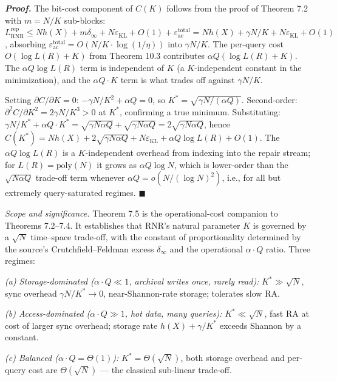 \documentclass[
]{article}
\begin{document}
\emph{\textbf{Proof.}} The bit-cost component of $C(K)$ follows from
the proof of Theorem 7.2 with $m = N/K$ sub-blocks: $L^{\mathrm{rep}}_{\mathrm{RNR}}
\leq N h(X) + m \delta_\infty + N \varepsilon_{\mathrm{KL}} + O(1) +
\varepsilon_{\mathrm{ac}}^{\mathrm{total}} = N h(X) + \gamma N/K +
N \varepsilon_{\mathrm{KL}} + O(1)$, absorbing $\varepsilon_{\mathrm{ac}}^{\mathrm{total}}
= O(N/K \cdot \log(1/\eta))$ into $\gamma N/K$. The per-query cost
$O(\log L(R) + K)$ from Theorem 10.3 contributes $\alpha Q (\log L(R) + K)$.
The $\alpha Q \log L(R)$ term is independent of $K$ (a $K$-independent
constant in the minimization), and the $\alpha Q \cdot K$ term is what
trades off against $\gamma N / K$.

Setting $\partial C / \partial K = 0$:
$-\gamma N / K^2 + \alpha Q = 0$, so $K^* = \sqrt{\gamma N / (\alpha Q)}$.
Second-order: $\partial^2 C / \partial K^2 = 2 \gamma N / K^3 > 0$ at
$K^*$, confirming a true minimum. Substituting:
$\gamma N / K^* + \alpha Q \cdot K^* = \sqrt{\gamma N \alpha Q} +
\sqrt{\gamma N \alpha Q} = 2 \sqrt{\gamma N \alpha Q}$, hence
$C(K^*) = N h(X) + 2 \sqrt{\gamma N \alpha Q} + N \varepsilon_{\mathrm{KL}} +
\alpha Q \log L(R) + O(1)$. The $\alpha Q \log L(R)$ is a $K$-independent
overhead from indexing into the repair stream; for $L(R) = \mathrm{poly}(N)$
it grows as $\alpha Q \log N$, which is lower-order than the
$\sqrt{N \alpha Q}$ trade-off term whenever $\alpha Q = o(N / (\log N)^2)$,
i.e., for all but extremely query-saturated regimes.
\hfill$\blacksquare$

\emph{Scope and significance.} Theorem 7.5 is the operational-cost
companion to Theorems 7.2--7.4. It establishes that RNR's natural
parameter $K$ is governed by a $\sqrt{N}$ time--space trade-off, with
the constant of proportionality determined by the source's
Crutchfield--Feldman excess $\delta_\infty$ and the operational
$\alpha \cdot Q$ ratio. Three regimes:

\emph{(a) Storage-dominated ($\alpha \cdot Q \ll 1$, archival writes
once, rarely read):} $K^* \gg \sqrt{N}$, sync overhead $\gamma N /
K^* \to 0$, near-Shannon-rate storage; tolerates slow RA.

\emph{(b) Access-dominated ($\alpha \cdot Q \gg 1$, hot data, many
queries):} $K^* \ll \sqrt{N}$, fast RA at cost of larger sync overhead;
storage rate $h(X) + \gamma / K^*$ exceeds Shannon by a constant.

\emph{(c) Balanced ($\alpha \cdot Q = \Theta(1)$):} $K^* = \Theta(\sqrt{N})$,
both storage overhead and per-query cost are $\Theta(\sqrt{N})$ ---
the classical sub-linear trade-off.
\end{document}
